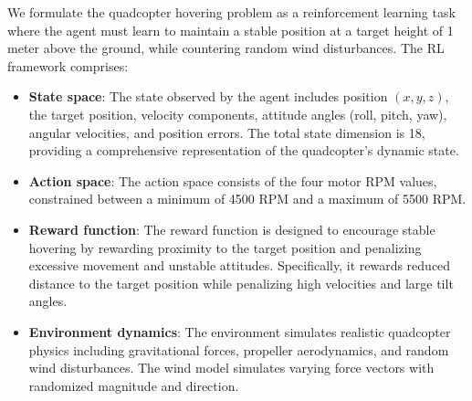 \documentclass[12pt]{article}
\begin{document}
We formulate the quadcopter hovering problem as a reinforcement learning task where the agent must learn to maintain a stable position at a target height of 1 meter above the ground, while countering random wind disturbances. The RL framework comprises:


\begin{itemize}
    \item \textbf{State space}: The state observed by the agent includes position $(x, y, z)$, the target position, velocity components, attitude angles (roll, pitch, yaw), angular velocities, and position errors. The total state dimension is 18, providing a comprehensive representation of the quadcopter's dynamic state.
    
    \item \textbf{Action space}: The action space consists of the four motor RPM values, constrained between a minimum of 4500 RPM and a maximum of 5500 RPM.
    
    \item \textbf{Reward function}: The reward function is designed to encourage stable hovering by rewarding proximity to the target position and penalizing excessive movement and unstable attitudes. Specifically, it rewards reduced distance to the target position while penalizing high velocities and large tilt angles.
    
    \item \textbf{Environment dynamics}: The environment simulates realistic quadcopter physics including gravitational forces, propeller aerodynamics, and random wind disturbances. The wind model simulates varying force vectors with randomized magnitude and direction.
\end{itemize}

%     
%     
%     
\end{document}
